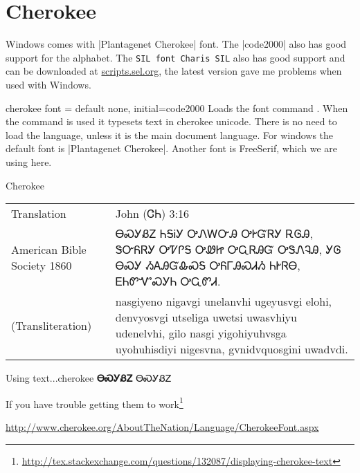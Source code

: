 \section{Cherokee}
\label{sec:cherokee}
Windows comes with |Plantagenet Cherokee| font. The |code2000| also has good support for the alphabet. The \texttt{SIL font Charis SIL} also has good support and can be downloaded at \href{http://scripts.sil.org/cms/scripts/page.php?item_id=CharisSIL_download}{scripts.sel.org}, the latest version gave me problems when used with Windows. 

  
\def\textcherokee#1{{\cherokee   #1}}


\begin{docKey}[phd]{cherokee font}{ = } {default none, initial=code2000}
 Loads the font
command \cmd{\cherokee}. When the command is used it typesets text in
cherokee unicode. There is no need to load the language, unless it is the main document language. For windows the default font is  |Plantagenet Cherokee|. Another font is FreeSerif, which we are using here.
\end{docKey}

\begin{scriptexample}[]{Cherokee}
{\cherokee
\begin{tabular}{lp{8.5cm}}
Translation	  &John (ᏣᏂ) 3:16\\
American Bible Society 1860	&ᎾᏍᎩᏰᏃ ᏂᎦᎥᎩ ᎤᏁᎳᏅᎯ ᎤᎨᏳᏒᎩ ᎡᎶᎯ, ᏕᏅᏲᏒᎩ ᎤᏤᎵᎦ ᎤᏪᏥ ᎤᏩᏒᎯᏳ ᎤᏕᏁᎸᎯ, ᎩᎶ ᎾᏍᎩ ᏱᎪᎯᏳᎲᏍᎦ ᎤᏲᎱᎯᏍᏗᏱ ᏂᎨᏒᎾ, ᎬᏂᏛᏉᏍᎩᏂ ᎤᏩᏛᏗ.\\

(Transliteration)	& nasgiyeno nigavgi unelanvhi ugeyusvgi elohi, denvyosvgi utseliga uwetsi uwasvhiyu udenelvhi, gilo nasgi yigohiyuhvsga uyohuhisdiyi nigesvna, gvnidvquosgini uwadvdi.\\
\end{tabular}}
\end{scriptexample}

\begin{texexample}{Using text...}{cherokee}
\bgroup
\cherokee \large\textbf{ᎾᏍᎩᏰᏃ}
\textcherokee{ᎾᏍᎩᏰᏃ}
\egroup
\end{texexample}

If you have trouble getting them to work\footnote{\url{http://tex.stackexchange.com/questions/132087/displaying-cherokee-text}}

\url{http://www.cherokee.org/AboutTheNation/Language/CherokeeFont.aspx}



